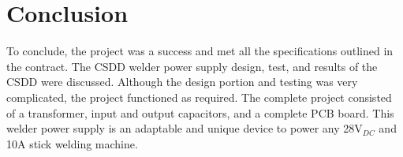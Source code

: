 \documentclass[11pt]{article}
\begin{document}
\section{Conclusion}
    
    To conclude, the project was a success and met all the specifications outlined in the contract. The CSDD welder power supply design, test, and results of the CSDD were discussed. Although the design portion and testing was very complicated, the project functioned as required. The complete project consisted of a transformer, input and output capacitors, and a complete PCB board. This welder power supply is an adaptable and unique device to power any 28V$_{DC}$ and 10A stick welding machine. 

\newpage

\printbibliography

\newpage
\appendix
\appendixpage
\addapptotoc
\begin{minipage}[t]{0.7\linewidth}
  
\end{minipage}












\end{document}
